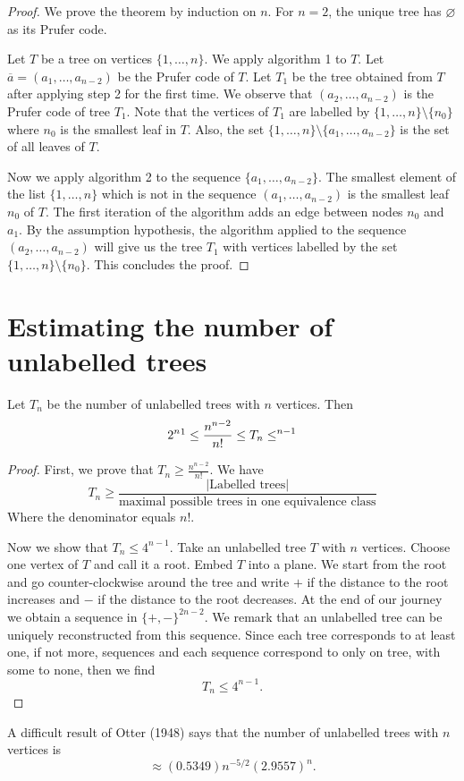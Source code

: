 \begin{proof}
We prove the theorem by induction on $n$. For $n=2$, the unique tree has $\varnothing$ as its Prufer code.

Let $T$ be a tree on vertices $\{ 1,\dots ,n \}$. We apply algorithm 1 to $T$. Let $\overline{a}=(a_{1},\dots,a_{n-2})$ be the Prufer code of $T$. Let $T_{1}$ be the tree obtained from $T$ after applying step 2 for the first time. We observe that $(a_{2},\dots,a_{n-2})$ is the Prufer code of tree $T_{1}$. Note that the vertices of $T_{1}$ are labelled by $\{ 1,\dots,n \}\setminus \{ n_{0} \}$ where $n_{0}$ is the smallest leaf in $T$. Also, the set $\{ 1,\dots,n \}\setminus \{ a_{1},\dots,a_{n-2} \}$ is the set of all leaves of $T$.

Now we apply algorithm 2 to the sequence $\{ a_{1},\dots,a_{n-2} \}$. The smallest element of the list $\{ 1,\dots,n \}$ which is not in the sequence $(a_{1},\dots,a_{n-2})$ is the smallest leaf $n_{0}$ of $T$. The first iteration of the algorithm adds an edge between nodes $n_{0}$ and $a_{1}$. By the assumption hypothesis, the algorithm applied to the sequence $(a_{2},\dots,a_{n-2})$ will give us the tree $T_{1}$ with vertices labelled by the set $\{ 1,\dots,n \}\setminus \{ n_{0} \}$. This concludes the proof.
\end{proof}

\section{Estimating the number of unlabelled trees}

\begin{theorem}
Let $T_{n}$ be the number of unlabelled trees with $n$ vertices. Then 
$$
2^{n}\footnotemark{}\le \frac{n^{n-2}}{n!}\le T_{n}\le ^{n-1}
$$
\end{theorem}
\begin{proof}
First, we prove that $T_{n}\ge \frac{n^{n-2}}{n!}$. We have
$$
T_{n}\ge \frac{|\text{Labelled trees}|}{\text{maximal possible trees in one equivalence class}}
$$
Where the denominator equals $n!$.

Now we show that $T_{n}\le 4^{n-1}$. Take an unlabelled tree $T$ with $n$ vertices. Choose one vertex of $T$ and call it a root. Embed $T$ into a plane. We start from the root and go counter-clockwise around the tree and write $+$ if the distance to the root increases and $-$ if the distance to the root decreases. At the end of our journey we obtain a sequence in $\{ +,- \}^{2n-2}$. We remark that an unlabelled tree can be uniquely reconstructed from this sequence. Since each tree corresponds to at least one, if not more, sequences and each sequence correspond to only on tree, with some to none, then we find 
$$
T_{n}\le 4^{n-1}.
$$
\end{proof}
\begin{remark}
A difficult result of Otter (1948) says that the number of unlabelled trees with $n$ vertices is
$$
\approx (0.5349)n^{-5/2}(2.9557)^{n}.
$$
\end{remark}

